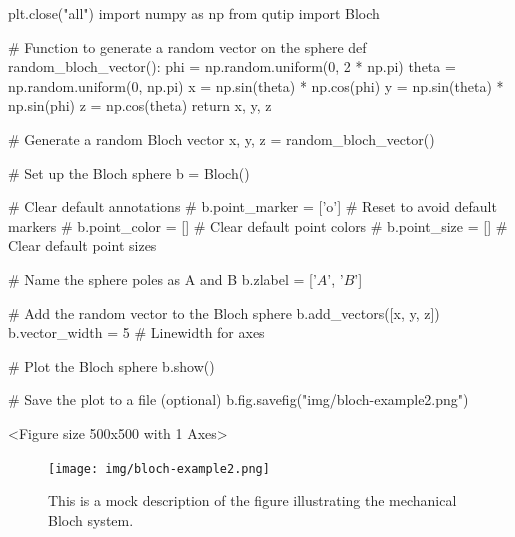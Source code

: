   \begin{python}
  plt.close("all")
  import numpy as np
  from qutip import Bloch

  # Function to generate a random vector on the sphere
  def random_bloch_vector():
      phi = np.random.uniform(0, 2 * np.pi)
      theta = np.random.uniform(0, np.pi)
      x = np.sin(theta) * np.cos(phi)
      y = np.sin(theta) * np.sin(phi)
      z = np.cos(theta)
      return x, y, z

  # Generate a random Bloch vector
  x, y, z = random_bloch_vector()

  # Set up the Bloch sphere
  b = Bloch()

  # Clear default annotations
  # b.point_marker = ['o']  # Reset to avoid default markers
  # b.point_color = []      # Clear default point colors
  # b.point_size = []       # Clear default point sizes

  # Name the sphere poles as A and B
  b.zlabel = ['$A$', '$B$']

  # Add the random vector to the Bloch sphere
  b.add_vectors([x, y, z])
  b.vector_width = 5  # Linewidth for axes

  # Plot the Bloch sphere
  b.show()

  # Save the plot to a file (optional)
  b.fig.savefig("img/bloch-example2.png")
  \end{python}



  \begin{result}
  <Figure size 500x500 with 1 Axes>
  \end{result}

\begin{figure}[h!]
  \centering
  \texttt{[image: img/bloch-example2.png]}
  \caption{This is a mock description of the figure illustrating the mechanical Bloch system.}
  \label{fig:mechanical_bloch}
\end{figure}

